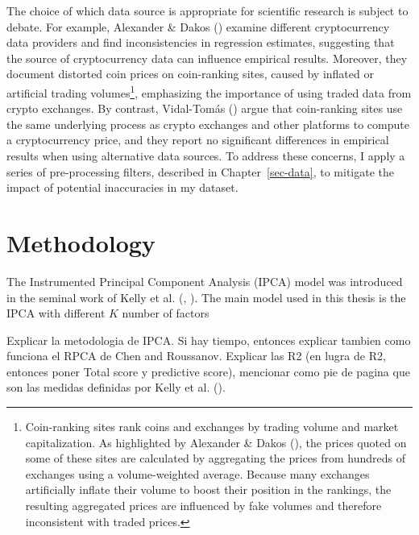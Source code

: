 \documentclass[
  12pt,
  a4paper,
  openany]{scrbook}
\begin{document}
The choice of which data source is appropriate for scientific research
is subject to debate. For example, Alexander \& Dakos
() examine
different cryptocurrency data providers and find inconsistencies in
regression estimates, suggesting that the source of cryptocurrency data
can influence empirical results. Moreover, they document distorted coin
prices on coin-ranking sites, caused by inflated or artificial trading
volumes\footnote{Coin-ranking sites rank coins and exchanges by trading
  volume and market capitalization. As highlighted by Alexander \& Dakos
  (), the prices
  quoted on some of these sites are calculated by aggregating the prices
  from hundreds of exchanges using a volume-weighted average. Because
  many exchanges artificially inflate their volume to boost their
  position in the rankings, the resulting aggregated prices are
  influenced by fake volumes and therefore inconsistent with traded
  prices.}, emphasizing the importance of using traded data from crypto
exchanges. By contrast, Vidal-Tomás
() argue that
coin-ranking sites use the same underlying process as crypto exchanges
and other platforms to compute a cryptocurrency price, and they report
no significant differences in empirical results when using alternative
data sources. To address these concerns, I apply a series of
pre-processing filters, described in Chapter~\ref{sec-data}, to mitigate
the impact of potential inaccuracies in my dataset.


\chapter{Methodology}\label{sec-methodology}

The Instrumented Principal Component Analysis (IPCA) model was
introduced in the seminal work of Kelly et al.
(,
). The main model
used in this thesis is the IPCA with different \(K\) number of factors

Explicar la metodologia de IPCA. Si hay tiempo, entonces explicar
tambien como funciona el RPCA de Chen and Roussanov. Explicar las R2 (en
lugra de R2, entonces poner Total score y predictive score), mencionar
como pie de pagina que son las medidas definidas por Kelly et al.
().
\end{document}
